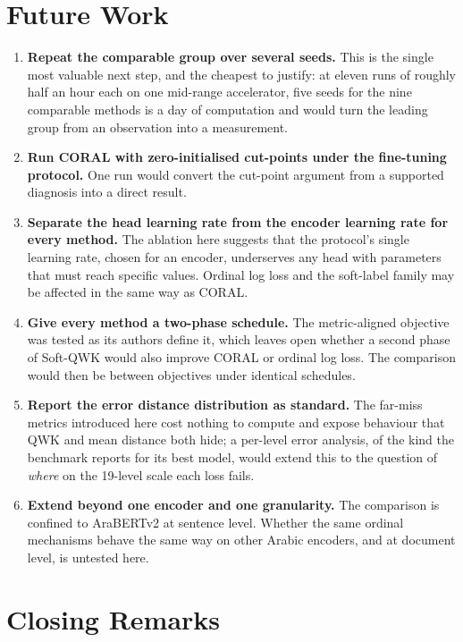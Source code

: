 \section{Future Work}

\begin{enumerate}
\item \textbf{Repeat the comparable group over several seeds.} This is the single most valuable
next step, and the cheapest to justify: at eleven runs of roughly half an hour each on one
mid-range accelerator, five seeds for the nine comparable methods is a day of computation and
would turn the leading group from an observation into a measurement.

\item \textbf{Run CORAL with zero-initialised cut-points under the fine-tuning protocol.} One
run would convert the cut-point argument from a supported diagnosis into a direct result.

\item \textbf{Separate the head learning rate from the encoder learning rate for every method.}
The ablation here suggests that the protocol's single learning rate, chosen for an encoder,
underserves any head with parameters that must reach specific values. Ordinal log loss and the
soft-label family may be affected in the same way as CORAL.

\item \textbf{Give every method a two-phase schedule.} The metric-aligned objective was tested
as its authors define it, which leaves open whether a second phase of Soft-QWK would also
improve CORAL or ordinal log loss. The comparison would then be between objectives under
identical schedules.

\item \textbf{Report the error distance distribution as standard.} The far-miss metrics
introduced here cost nothing to compute and expose behaviour that QWK and mean distance both
hide; a per-level error analysis, of the kind the benchmark reports for its best model, would
extend this to the question of \emph{where} on the 19-level scale each loss fails.

\item \textbf{Extend beyond one encoder and one granularity.} The comparison is confined to
AraBERTv2 at sentence level. Whether the same ordinal mechanisms behave the same way on other
Arabic encoders, and at document level, is untested here.
\end{enumerate}

\section{Closing Remarks}

